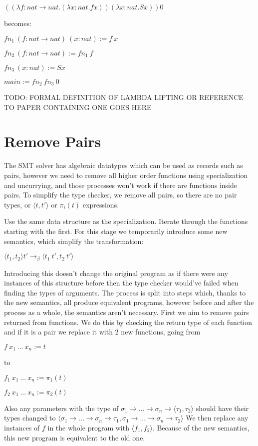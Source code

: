 \documentclass[12pt,a4paper,titlepage]{article}
\begin{document}
    $((\lambda f: nat \rightarrow nat . (\lambda x: nat . f x)) (\lambda x: nat . S x)) 0$

    becomes:

    $fn_1\ (f: nat \rightarrow nat)\ (x: nat) := f\ x$

    $fn_2\ (f: nat \rightarrow nat) := fn_1\ f$

    $fn_3\ (x: nat) := S x$

    $main := fn_2\ fn_3\ 0$

    TODO: FORMAL DEFINITION OF LAMBDA LIFTING OR REFERENCE TO PAPER CONTAINING ONE GOES HERE

    \section{Remove Pairs}

    The SMT solver has algebraic datatypes which can be used as records such as pairs, however we need to remove
    all higher order functions using specialization and uncurrying, and those processes won't work if there
    are functions inside pairs.
    To simplify the type checker, we remove all pairs, so there are no pair types, or $\langle t, t' \rangle$ or
    $\pi_i (t)$ expressions.

    Use the same data structure as the specialization. Iterate through the functions starting with the first.
    For this stage we temporarily introduce some new semantics, which simplify the transformation:

    $\langle t_1, t_2 \rangle t' \rightarrow_\beta \langle t_1\ t', t_2\ t' \rangle$

    Introducing this doesn't change the original program as if there were any instances of this structure before
    then the type checker would've failed when finding the types of arguments.
    The process is split into steps which, thanks to the new semantics, all produce equivalent programs,
    however before and after the process as a whole, the semantics aren't necessary.
    First we aim to remove pairs returned from functions. We do this by checking the return type of each function
    and if it is a pair we replace it with 2 new functions, going from

    $f\ x_1\ ...\ x_n := t$

    to

    $f_1\ x_1\ ...\ x_n := \pi_1(t)$

    $f_2\ x_1\ ...\ x_n := \pi_2(t)$

    Also any parameters with the type of
    $\sigma_1 \rightarrow ... \rightarrow \sigma_n \rightarrow \langle \tau_1, \tau_2 \rangle$
    should have their types changed to
    $\langle \sigma_1 \rightarrow ... \rightarrow \sigma_n \rightarrow \tau_1, \sigma_1 \rightarrow ... \rightarrow \sigma_n \rightarrow \tau_2 \rangle$
    We then replace any instances of $f$ in the whole program with $\langle f_1, f_2 \rangle$.
    Because of the new semantics, this new program is equivalent to the old one.
\end{document}
